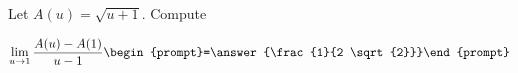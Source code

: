 \documentclass{ximera}
\author{Bart Snapp}
\begin{document}
\begin{exercise}
Let $A(u) = \sqrt{u+1}$. Compute

\[
\lim_{ u\to 1 } 
\frac{A(u)-A(1)}{u-1} \begin{prompt}=\answer{\frac{1}{2 \sqrt{2}}}\end{prompt}
\]
\end{exercise}
\end{document}
